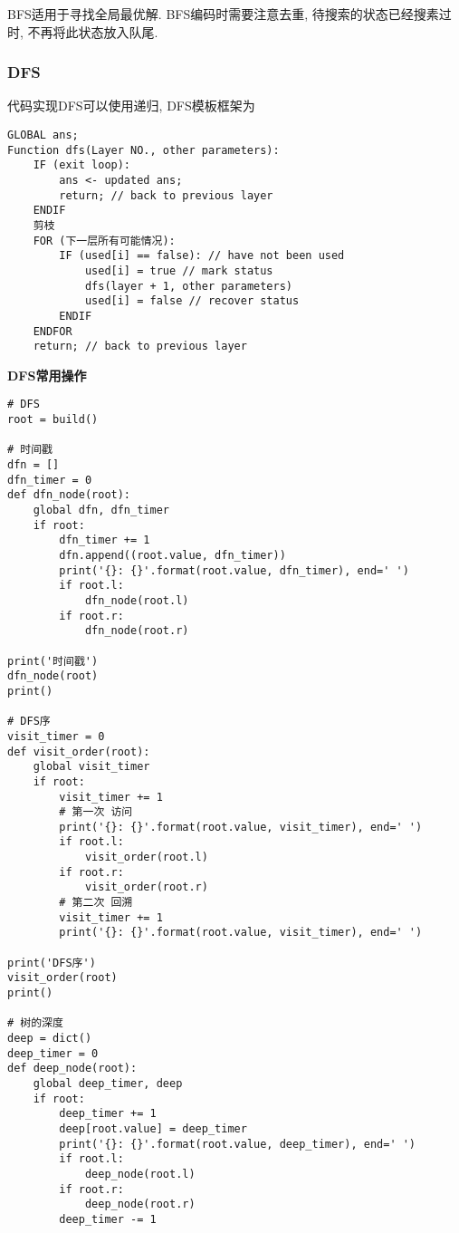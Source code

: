 \documentclass[../main]{subfiles}
\begin{document}
\begin{sloppy}
        BFS适用于寻找全局最优解. BFS编码时需要注意去重, 待搜索的状态已经搜素过时, 不再将此状态放入队尾.
        

        \subsubsection{DFS}

            代码实现DFS可以使用递归, DFS模板框架为

            \begin{lstlisting}[style = Pseudocode]
GLOBAL ans;
Function dfs(Layer NO., other parameters):
    IF (exit loop):
        ans <- updated ans;
        return; // back to previous layer
    ENDIF
    剪枝
    FOR (下一层所有可能情况):
        IF (used[i] == false): // have not been used
            used[i] = true // mark status
            dfs(layer + 1, other parameters)
            used[i] = false // recover status
        ENDIF
    ENDFOR
    return; // back to previous layer
            \end{lstlisting}

            \textbf{DFS常用操作}

            \begin{lstlisting}[style = Python]
            # DFS
root = build()

# 时间戳
dfn = []
dfn_timer = 0
def dfn_node(root):
    global dfn, dfn_timer
    if root:
        dfn_timer += 1
        dfn.append((root.value, dfn_timer))
        print('{}: {}'.format(root.value, dfn_timer), end=' ')
        if root.l:
            dfn_node(root.l)
        if root.r:
            dfn_node(root.r)

print('时间戳')
dfn_node(root)
print()

# DFS序
visit_timer = 0
def visit_order(root):
    global visit_timer
    if root:
        visit_timer += 1
        # 第一次 访问
        print('{}: {}'.format(root.value, visit_timer), end=' ')
        if root.l:
            visit_order(root.l)
        if root.r:
            visit_order(root.r)
        # 第二次 回溯
        visit_timer += 1
        print('{}: {}'.format(root.value, visit_timer), end=' ')

print('DFS序')
visit_order(root)
print()

# 树的深度
deep = dict()
deep_timer = 0
def deep_node(root):
    global deep_timer, deep
    if root:
        deep_timer += 1
        deep[root.value] = deep_timer
        print('{}: {}'.format(root.value, deep_timer), end=' ')
        if root.l:
            deep_node(root.l)
        if root.r:
            deep_node(root.r)
        deep_timer -= 1


\end{lstlisting}
\end{sloppy}
\end{document}
